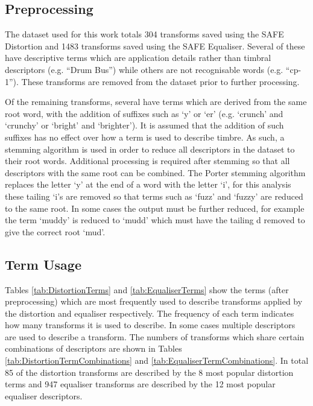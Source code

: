 	\subsection{Preprocessing}
	\label{sec:TimbreEvaluation-Analysis-Preprocessing}
		The dataset used for this work totals 304 transforms saved using the SAFE Distortion and 1483 transforms
		saved using the SAFE Equaliser. Several of these have descriptive terms which are application details
		rather than timbral descriptors (e.g. ``Drum Bus'') while others are not recognisable words (e.g.
		``cp-1''). These transforms are removed from the dataset prior to further processing.

		Of the remaining transforms, several have terms which are derived from the same root word, with the
		addition of suffixes such as `y' or `er' (e.g. `crunch' and `crunchy' or `bright' and `brighter'). It is
		assumed that the addition of such suffixes has no effect over how a term is used to describe timbre. As
		such, a stemming algorithm \citep{porter1980an} is used in order to reduce all descriptors in the dataset
		to their root words.  Additional processing is required after stemming so that all descriptors with the
		same root can be combined.  The Porter stemming algorithm replaces the letter `y' at the end of a word with
		the letter `i', for this analysis these tailing `i's are removed so that terms such as `fuzz' and `fuzzy'
		are reduced to the same root. In some cases the output must be further reduced, for example the term
		`muddy' is reduced to `mudd' which must have the tailing d removed to give the correct root `mud'.

	\subsection{Term Usage}
	\label{sec:TimbreEvaluation-Analysis-TermUsage}
		Tables \ref{tab:DistortionTerms} and \ref{tab:EqualiserTerms} show the terms (after preprocessing) which
		are most frequently used to describe transforms applied by the distortion and equaliser respectively. The
		frequency of each term indicates how many transforms it is used to describe. In some cases multiple
		descriptors are used to describe a transform. The numbers of transforms which share certain combinations of
		descriptors are shown in Tables \ref{tab:DistortionTermCombinations} and
		\ref{tab:EqualiserTermCombinations}. In total 85 of the distortion transforms are described by the 8 most
		popular distortion terms and 947 equaliser transforms are described by the 12 most popular equaliser
		descriptors.

